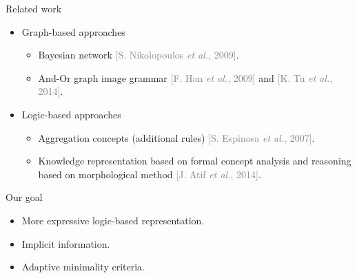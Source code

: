 \documentclass{beamer}
\begin{document}
\begin{frame}{Related work}

 \begin{itemize}
  \item Graph-based approaches
  \begin{itemize}
   \item Bayesian network \textcolor{gray}{[S. Nikolopoulos \textit{et al.}, 2009]}.
   \item And-Or graph image grammar  \textcolor{gray}{[F. Han \textit{et al.}, 2009]} and \textcolor{gray}{[K. Tu \textit{et al.}, 2014]}.
  \end{itemize}
  \item Logic-based approaches
  \begin{itemize}
   \item Aggregation concepts (additional rules) \textcolor{gray}{[S. Espinosa \textit{et al.}, 2007]}.
   \item Knowledge representation based on formal concept analysis and reasoning based on morphological method \textcolor{gray}{[J. Atif \textit{et al.}, 2014]}.
  \end{itemize}
 \end{itemize}
 
 \begin{alertblock}{Our goal}
   \begin{itemize}
    \item More expressive logic-based representation.
    \item Implicit information.
    \item Adaptive minimality criteria.
   \end{itemize}
 \end{alertblock}
\end{frame}
\end{document}
